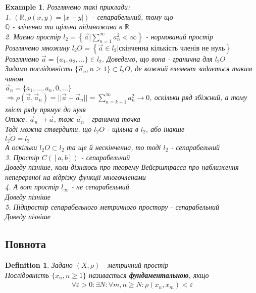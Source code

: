\documentclass[a4paper, 14pt]{extarticle}
\def\huge{\displaystyle}
\theoremstyle{theoremdd}
\theoremstyle{theoremdd}
\newtheorem{definition}[theorem]{Definition}
\theoremstyle{theoremdd}
\theoremstyle{theoremdd}
\newtheorem{example}[theorem]{Example}
\theoremstyle{theoremdd}
\theoremstyle{theoremdd}
\theoremstyle{theoremdd}
\theoremstyle{theoremdd}
\begin{document}
\begin{example} Розглянемо такі приклади:\\
1. $(\mathbb{R}, \rho(x,y) = |x-y|)$ - сепарабельний, тому що\\
$\mathbb{Q}$ - зліченна та щільна підмножина в $\mathbb{R}$
\bigskip \\

2. Маємо простір $l_2 = \left\{ \vec{a} | \huge\sum_{n=1}^\infty a_n^2 < \infty \right\}$ - нормований простір\\
Розглянемо множину $l_2O = \left\{ \vec{a} \in l_2 | \text{скінченна кількість членів не нуль} \right\}$\\
Розглянемо $\vec{a} = \{a_1,a_2,\dots\} \in l_2$. Доведемо, що вона - гранична для $l_2O$\\
Задамо послідовність $\{\vec{a}_n, n \geq 1\} \subset l_2O$, де кожний елемент задається таким чином\\
$\vec{a}_n = \{a_1,\dots,a_n,0,\dots\}$\\
$\Rightarrow \rho(\vec{a}, \vec{a}_n) = ||\vec{a} - \vec{a}_n|| = \huge\sum_{n=k+1}^\infty a_n^2 \to 0$, оскільки ряд збіжний, а тому хвіст ряду прямує до нуля\\
Отже, $\vec{a}_n \to \vec{a}$, тож $\vec{a}_n$ - гранична точка\\
Тоді можна ствердити, що $l_2O$ - щільна в $l_2$, або інакше\\
$\overline{l_2O} = l_2$\\
А оскільки $l_2O \subset l_2$ та ще й нескінченна, то тоді $l_2$ - сепарабельний
\bigskip \\

3. Простір $C([a,b])$ - сепарабельний\\
\textit{Доведу пізніше, коли дізнаюсь про теорему Вейєрштрасса про наближення неперервної на відрізку функції многочленами}
\bigskip \\

4. А вот простір $l_{\infty}$ - не сепарабельний\\
\textit{Доведу пізніше}
\bigskip \\

5. Підпростір сепарабельного метричного простору - сепарабельний\\
\textit{Доведу пізніше}
\end{example}

\subsection{Повнота}
\begin{definition}
Задано $(X,\rho)$ - метричний простір\\
Послідовність $\{x_n, n \geq 1\}$ називається \textbf{фундаментальною}, якщо
\begin{align*}
\forall \varepsilon > 0: \exists N: \forall m,n \geq N: \rho(x_n,x_m) < \varepsilon
\end{align*}
\end{definition}
\end{document}

